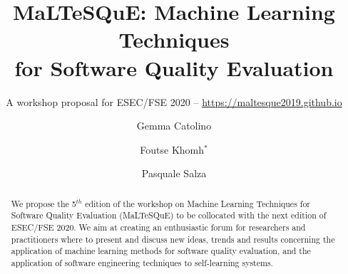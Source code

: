 \documentclass[sigconf,review]{acmart}
\begin{document}
	\title{MaLTeSQuE: Machine Learning Techniques \\
		for Software Quality Evaluation}
	\subtitle{A workshop proposal for ESEC/FSE 2020 -- \url{https://maltesque2019.github.io}}
	
	\author{Gemma Catolino}
	
		\author{Foutse Khomh$^*$}
	
	\author{Pasquale Salza}
	
	

\begin{abstract}
We propose the 5$^{th}$ edition of the workshop on Machine Learning Techniques for Software Quality Evaluation (MaLTeSQuE) to be collocated with the next edition of ESEC/FSE 2020.
We aim at creating an enthusiastic forum for researchers and practitioners where to present and discuss new ideas, trends and results concerning the application of machine learning methods for software quality evaluation, and the application of software engineering techniques to self-learning systems.
\end{abstract}


\maketitle









\balance
	
\end{document}
